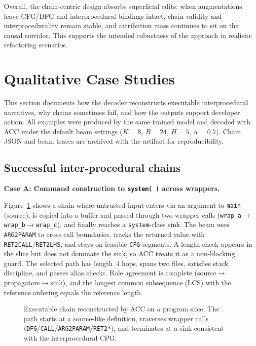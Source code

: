 \documentclass{buthesis}
\begin{document}
Overall, the chain-centric design absorbs superficial edits: when augmentations leave CFG/DFG and interprocedural bindings intact, chain validity and interprocedurality remain stable, and attribution mass continues to sit on the causal corridor. This supports the intended robustness of the approach in realistic refactoring scenarios.



\section{Qualitative Case Studies}
\label{sec:results-qual}

This section documents how the decoder reconstructs executable interprocedural narratives, why chains sometimes fail, and how the outputs support developer action. All examples were produced by the same trained model and decoded with ACC under the default beam settings ($K{=}8$, $B{=}24$, $H{=}5$, $\alpha{=}0.7$). Chain JSON and beam traces are archived with the artifact for reproducibility.

\subsection{Successful inter-procedural chains}
\label{subsec:qual-success}

\textbf{Case A: Command construction to \texttt{system(\,)} across wrappers.}

Figure~\ref{fig:demo-chain} shows a chain where untrusted input enters via an argument to \texttt{main} (source), is copied into a buffer and passed through two wrapper calls (\texttt{wrap\_a}$\to$\texttt{wrap\_b}$\to$\texttt{wrap\_c}), and finally reaches a \texttt{system}-class sink. The beam uses \texttt{ARG2PARAM} to cross call boundaries, tracks the returned value with \texttt{RET2CALL}/\texttt{RET2LHS}, and stays on feasible \texttt{CFG} segments. A length check appears in the slice but does not dominate the sink, so ACC treats it as a non-blocking guard. The selected path has length~4 hops, spans two files, satisfies stack discipline, and passes alias checks. Role agreement is complete (source$\to$propagators$\to$sink), and the longest common subsequence (LCS) with the reference ordering equals the reference length.


\begin{figure}[H]
	\centering
	
	\caption{Executable chain reconstructed by ACC on a program slice. The path starts at a source-like definition, traverses wrapper calls (\texttt{DFG}/\texttt{CALL}/\texttt{ARG2PARAM}/\texttt{RET2*}), and terminates at a sink consistent with the interprocedural CPG.}
	\label{fig:demo-chain}
\end{figure}
\end{document}
